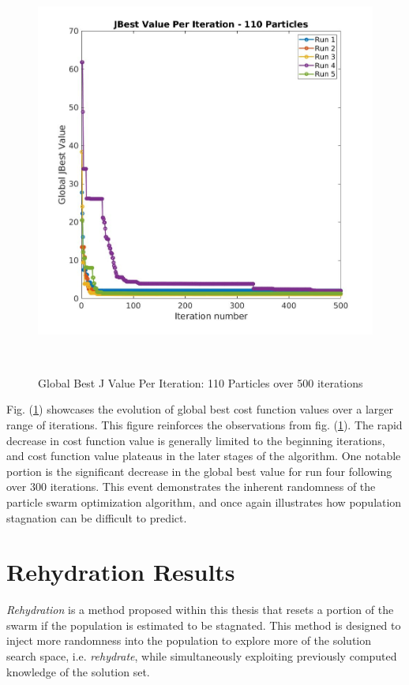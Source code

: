 \begin{figure}[H]
    \includegraphics[width=\linewidth, height=13.5cm]{./jpgs/i500.jpg}
    \caption{Global Best J Value Per Iteration: 110 Particles over 500 iterations}
    \label{fig:gBestPer500Iter}
    \end{figure}

\noindent Fig. (\ref{fig:gBestPer500Iter}) showcases the evolution of global best cost function values over a larger 
range of iterations. This figure reinforces the observations from fig. (\ref{fig:gBestPer500Iter}). The rapid decrease 
in cost function value is generally limited to the beginning iterations, and cost function value
plateaus in the later stages of the algorithm. One notable portion is the significant decrease in the global best 
value for run four following over 300 iterations. This event demonstrates the inherent randomness of the particle swarm 
optimization algorithm, and once again illustrates how population stagnation can be difficult to predict.

\section{Rehydration Results}

\noindent \textit{Rehydration} is a method proposed within this thesis that resets a portion of the swarm if the population is estimated to 
be stagnated. This method is designed to inject more randomness into the population to explore more of the solution search space, 
i.e. \textit{rehydrate}, while
simultaneously exploiting previously computed knowledge of the solution set.

